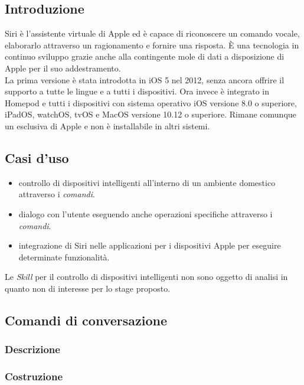 	\subsection{Introduzione}
	Siri è l'assistente virtuale di Apple ed è capace di riconoscere un comando vocale, elaborarlo attraverso un ragionamento e fornire una risposta. È una tecnologia in continuo sviluppo grazie anche alla contingente mole di dati a disposizione di Apple per il suo addestramento. \\
	La prima versione è stata introdotta in iOS 5 nel 2012, senza ancora offrire il supporto a tutte le lingue e a tutti i dispositivi. Ora invece è integrato in Homepod e tutti i dispositivi con sistema operativo iOS versione 8.0 o superiore, iPadOS, watchOS, tvOS e MacOS versione 10.12 o superiore. Rimane comunque un esclusiva di Apple e non è installabile in altri sistemi.
	\subsection{Casi d'uso}
	\begin{itemize}
		\item controllo di dispositivi intelligenti all'interno di un ambiente domestico attraverso i \textit{comandi}.
		\item dialogo con l'utente eseguendo anche operazioni specifiche attraverso i \textit{comandi}.
		\item integrazione di Siri nelle applicazioni per i dispositivi Apple per eseguire determinate funzionalità.
	\end{itemize}
	Le \textit{Skill} per il controllo di dispositivi intelligenti non sono oggetto di analisi in quanto non di interesse per lo stage proposto.
	\subsection{Comandi di conversazione}
		\subsubsection{Descrizione}
		\subsubsection{Costruzione}
